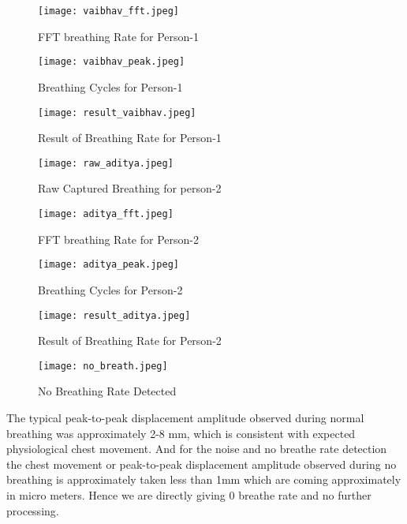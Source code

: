 \documentclass[12pt]{article}
\begin{document}
\begin{figure}[H]
\centering
\texttt{[image: vaibhav\_fft.jpeg]} %
\caption{FFT breathing Rate for Person-1 }
\end{figure}

\begin{figure}[H]
\centering
\texttt{[image: vaibhav\_peak.jpeg]} %
\caption{Breathing Cycles for Person-1 }
\end{figure}


\begin{figure}[H]
\centering
\texttt{[image: result\_vaibhav.jpeg]} %
\caption{Result of Breathing Rate for Person-1 }
\end{figure}

\begin{figure}[H]
\centering
\texttt{[image: raw\_aditya.jpeg]} %
\caption{Raw Captured Breathing for person-2 }

\end{figure}

\begin{figure}[H]
\centering
\texttt{[image: aditya\_fft.jpeg]} %
\caption{FFT breathing Rate for Person-2 }

\end{figure}


\begin{figure}[H]
\centering
\texttt{[image: aditya\_peak.jpeg]} %
\caption{Breathing Cycles for Person-2 }
\end{figure}

\begin{figure}[H]
\centering
\texttt{[image: result\_aditya.jpeg]} %
\caption{Result of Breathing Rate for Person-2 }
\end{figure}


\begin{figure}[H]
\centering
\texttt{[image: no\_breath.jpeg]} %
\caption{No Breathing Rate Detected}
\end{figure}

The typical peak-to-peak displacement amplitude observed during normal breathing was approximately 2-8 mm, which is consistent with expected physiological chest movement. And for the noise and no breathe rate detection the chest movement or peak-to-peak displacement amplitude observed during no breathing is approximately taken less than 1mm which are coming approximately in micro meters. Hence we are directly giving 0 breathe rate and no further processing.
\end{document}
